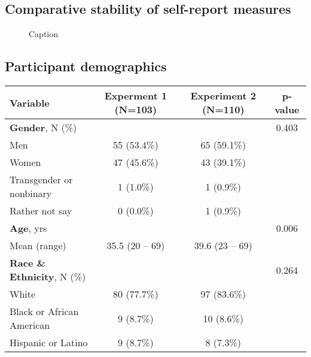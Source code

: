 \documentclass[a4paper,12pt]{article}
\begin{document}
\begin{refsection}[supp]
\clearpage
\subsection*{Comparative stability of self-report measures}

\begin{figure}[h]
    \centerline{}
    \caption{Caption}
    \label{fig:figS05}
\end{figure}

\clearpage
\subsection*{Participant demographics}

\begin{table}[h]
    \centering
    \begin{tabular*}{\textwidth}{lccc}
    \toprule
    Variable & \small Experment 1 (N=103) & \small Experiment 2 (N=110)  & p-value \\
    \midrule
    \textbf{Gender}, N (\%)                & & & 0.403 \\
    \hspace{1em} Men                       & 55 (53.4\%) & 65 (59.1\%) & \\
    \hspace{1em} Women                     & 47 (45.6\%) & 43 (39.1\%) & \\
    \hspace{1em} Transgender or nonbinary         &   1  (1.0\%) &   1  (0.9\%) & \\
    \hspace{1em} Rather not say            &   0  (0.0\%) &   1  (0.9\%) & \\
    \midrule
    \textbf{Age}, yrs                      & & & 0.006 \\
    \hspace{1em} Mean (range)              & 35.5 (20 -- 69) & 39.6 (23 -- 69) & \\
    \midrule
    \textbf{Race \& Ethnicity}, N (\%)                  & & & 0.264 \\
    \hspace{1em} White                     & 80 (77.7\%) &  97 (83.6\%) & \\ 
    \hspace{1em} Black or African American &  9  (8.7\%) &  10  (8.6\%) & \\
    \hspace{1em} Hispanic or Latino        &  9  (8.7\%) &  8  (7.3\%) & \\

\end{tabular*}
\end{table}
\end{refsection}
\end{document}
